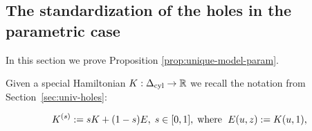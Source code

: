 \documentclass[12pt]{paper}
\theoremstyle{plain}
\theoremstyle{definition}
\newcommand{\eps}{\varepsilon}
\newcommand{\abs}[1]{\left| #1 \right|}
\newcommand{\R}{{\mathbb{R}}}
\newcommand{\cyl}{{\rm cyl}}
\newcommand{\Int}{{\rm Int\,}} %
\renewcommand{\max}{{\rm max}}
\numberwithin{figure}{section}
\begin{document}
 \subsection{The standardization of the holes in the parametric case}\label{sec:standard-param}
 In this section we prove Proposition \ref{prop:unique-model-param}.
 
Given a special Hamiltonian $K:\Delta_\cyl\to\R$ we recall  the notation from Section~\ref{sec:univ-holes}:
 
 $$K^{(s)}: = sK + (1-s)E, \; s\in[0,1], \;\hbox{where  }\; E(u,z):=K(u,1),$$
% 
   
   
 
\end{document}
